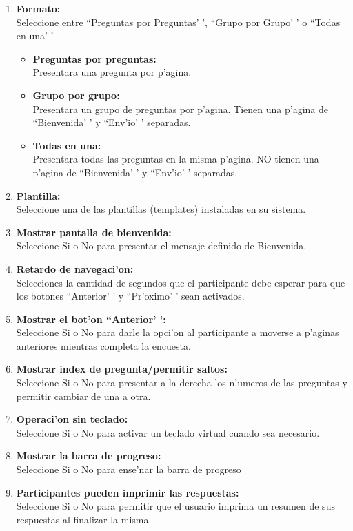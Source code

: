 \documentclass[12pt,spanish]{report}
\begin{document}
\begin{enumerate}
	\item {\bf Formato: } \\ Seleccione entre ``Preguntas por Preguntas' ', ``Grupo por Grupo' ' o ``Todas en una' '
	\begin{itemize}
		\item {\bf Preguntas por preguntas: } \\ Presentara una pregunta por p'agina.
		\item {\bf Grupo por grupo: } \\ Presentara un grupo de preguntas por p'agina. Tienen una p'agina de ``Bienvenida' ' y ``Env'io' ' separadas.
		\item {\bf Todas en una: } \\ Presentara todas las preguntas en la misma p'agina. NO tienen una p'agina de ``Bienvenida' ' y ``Env'io' ' separadas.
	\end{itemize}
	\item {\bf Plantilla: } \\ Seleccione una de las plantillas (templates) instaladas en su sistema.
	\item {\bf Mostrar pantalla de bienvenida: } \\ Seleccione Si o No para presentar el mensaje definido de Bienvenida.
	\item {\bf Retardo de navegaci'on: } \\ Selecciones la cantidad de segundos que el participante debe esperar para que los botones ``Anterior' ' y ``Pr'oximo' ' sean activados.
	\item {\bf Mostrar el bot'on ``Anterior' ': } \\ Seleccione Si o No para darle la opci'on al participante a moverse a p'aginas anteriores mientras completa la encuesta.
	\item {\bf Mostrar index de pregunta/permitir saltos: } \\ Seleccione Si o No para presentar a la derecha los n'umeros de las preguntas y permitir cambiar de una a otra.
	\item {\bf Operaci'on sin teclado: } \\ Seleccione Si o No para activar un teclado virtual cuando sea necesario.
	\item {\bf Mostrar la barra de progreso: } \\ Seleccione Si o No para ense'nar la barra de progreso
	\item {\bf Participantes pueden imprimir las respuestas: } \\ Seleccione Si o No para permitir que el usuario imprima un resumen de sus respuestas al finalizar la misma.

\end{enumerate}
\end{document}
